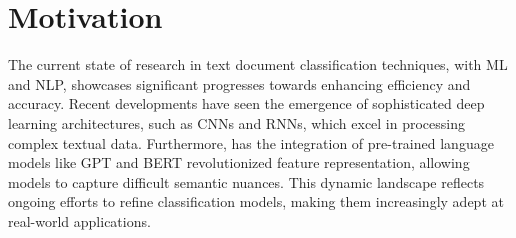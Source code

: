 \section{Motivation}

The current state of research in text document classification techniques, with ML and NLP, showcases significant progresses towards enhancing efficiency and accuracy. Recent developments have seen the emergence of sophisticated deep learning architectures, such as CNNs and RNNs, which excel in processing complex textual data. Furthermore, has the integration of pre-trained language models like GPT and BERT revolutionized feature representation, allowing models to capture difficult semantic nuances. This dynamic landscape reflects ongoing efforts to refine classification models, making them increasingly adept at real-world applications.












